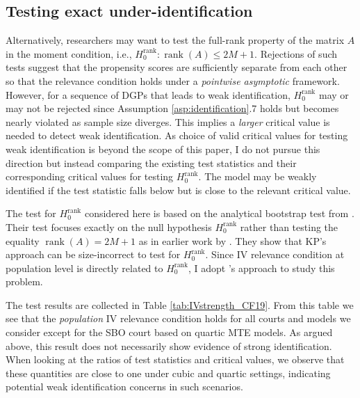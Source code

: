 \documentclass[11pt]{article}
\theoremstyle{definition}
\DeclareMathOperator*{\rank}{rank}
\newcommand{\0}{\ensuremath{\mathbf{0}}}
\begin{document}
\begin{bibunit}
\subsection{Testing exact under-identification}
Alternatively, researchers may want to test the full-rank property of the matrix $A$ in the moment condition, i.e., $H_0^{\text{rank}}: \rank(A) \leq 2M+1$. Rejections of such tests suggest that the propensity scores are sufficiently separate from each other so that the relevance condition holds under a \textit{pointwise asymptotic} framework. However, for a sequence of DGPs that leads to weak identification,  $H_0^{\text{rank}}$ may or may not be rejected since Assumption \ref{asp:identification}.7 holds but becomes nearly violated as sample size diverges. This implies a \textit{larger} critical value is needed to detect weak identification. As choice of valid critical values for testing weak identification is beyond the scope of this paper, I do not pursue this direction but instead comparing the existing test statistics and their corresponding critical values for testing $H_0^{\text{rank}}$. The model may be weakly identified if the test statistic falls below but is close to the relevant critical value.

The test for $H_0^{\text{rank}}$ considered here is based on the analytical bootstrap test from \cite{chen/fang:2019}. Their test focuses exactly on the null hypothesis $H_0^{\text{rank}}$ rather than testing the equality $\rank(A) = 2M+1$ as in earlier work by \citet{kleibergen/paap:2006}. They show that KP's approach can be size-incorrect to test for $H_0^{\text{rank}}$. Since IV relevance condition at population level is directly related to $H_0^{\text{rank}}$, I adopt \cite{chen/fang:2019}'s approach to study this problem. 

The test results are collected in Table \ref{tab:IVstrength_CF19}. From this table we see that the \textit{population} IV relevance condition holds for all courts and models we consider except for the SBO court based on quartic MTE models. As argued above, this result does not necessarily show evidence of strong identification. When looking at the ratios of test statistics and critical values, we observe that these quantities are close to one under cubic and quartic settings, indicating potential weak identification concerns in such scenarios. 


\end{bibunit}
\end{document}
